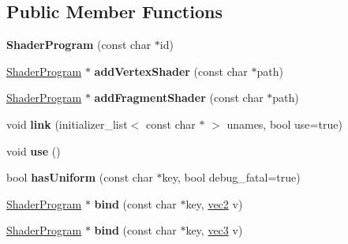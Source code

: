 \subsection*{Public Member Functions}
\begin{DoxyCompactItemize}
\item 
\hypertarget{classj3d_1_1ShaderProgram_a256861bced49d6b74052b369565e0a3a}{}{\bfseries Shader\+Program} (const char $\ast$id)\label{classj3d_1_1ShaderProgram_a256861bced49d6b74052b369565e0a3a}

\item 
\hypertarget{classj3d_1_1ShaderProgram_aabf534b9674a8c6e6bc3fc282b58370a}{}\hyperlink{classj3d_1_1ShaderProgram}{Shader\+Program} $\ast$ {\bfseries add\+Vertex\+Shader} (const char $\ast$path)\label{classj3d_1_1ShaderProgram_aabf534b9674a8c6e6bc3fc282b58370a}

\item 
\hypertarget{classj3d_1_1ShaderProgram_a55413493fe237ef5d44b37a49dcd007f}{}\hyperlink{classj3d_1_1ShaderProgram}{Shader\+Program} $\ast$ {\bfseries add\+Fragment\+Shader} (const char $\ast$path)\label{classj3d_1_1ShaderProgram_a55413493fe237ef5d44b37a49dcd007f}

\item 
\hypertarget{classj3d_1_1ShaderProgram_a5a254033a2f7262925b60e0341cf2faf}{}void {\bfseries link} (initializer\+\_\+list$<$ const char $\ast$ $>$ unames, bool use=true)\label{classj3d_1_1ShaderProgram_a5a254033a2f7262925b60e0341cf2faf}

\item 
\hypertarget{classj3d_1_1ShaderProgram_a51af6878076ba30d66d31729d2246cc8}{}void {\bfseries use} ()\label{classj3d_1_1ShaderProgram_a51af6878076ba30d66d31729d2246cc8}

\item 
\hypertarget{classj3d_1_1ShaderProgram_a1853b5309e07793de4bd144cf019c382}{}bool {\bfseries has\+Uniform} (const char $\ast$key, bool debug\+\_\+fatal=true)\label{classj3d_1_1ShaderProgram_a1853b5309e07793de4bd144cf019c382}

\item 
\hypertarget{classj3d_1_1ShaderProgram_a3112b9db7e260459fbee7e72660bff11}{}\hyperlink{classj3d_1_1ShaderProgram}{Shader\+Program} $\ast$ {\bfseries bind} (const char $\ast$key, \hyperlink{structj3d_1_1vec2}{vec2} v)\label{classj3d_1_1ShaderProgram_a3112b9db7e260459fbee7e72660bff11}

\item 
\hypertarget{classj3d_1_1ShaderProgram_a3cbc41a16d6a452405b754914cf7562b}{}\hyperlink{classj3d_1_1ShaderProgram}{Shader\+Program} $\ast$ {\bfseries bind} (const char $\ast$key, \hyperlink{structj3d_1_1vec3}{vec3} v)\label{classj3d_1_1ShaderProgram_a3cbc41a16d6a452405b754914cf7562b}


\end{DoxyCompactItemize}
